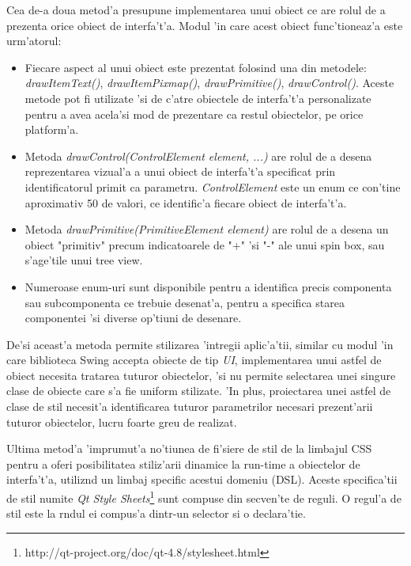 \medskip

Cea de-a doua metod'a presupune implementarea unui obiect ce are rolul de a prezenta orice obiect de interfa't'a. Modul 'in care acest obiect func'tioneaz'a este urm'atorul:

\begin{itemize}
\item Fiecare aspect al unui obiect este prezentat folosind una din metodele: \emph{drawItemText()}, \emph{drawItemPixmap()}, \emph{drawPrimitive()}, \emph{drawControl()}. Aceste metode pot fi utilizate 'si de c'atre obiectele de interfa't'a personalizate pentru a avea acela'si mod de prezentare ca restul obiectelor, pe orice platform'a. 
\item Metoda \emph{drawControl(ControlElement element, ...)} are rolul de a desena reprezentarea vizual'a a unui obiect de interfa't'a specificat prin identificatorul primit ca parametru. \emph{ControlElement} este un enum ce con'tine aproximativ 50 de valori, ce identific'a fiecare obiect de interfa't'a.
\item Metoda \emph{drawPrimitive(PrimitiveElement element)} are rolul de a desena un obiect "primitiv" precum indicatoarele de "+" 'si "-" ale unui spin box, sau s'age'tile unui tree view.
\item Numeroase enum-uri sunt disponibile pentru a identifica precis componenta sau subcomponenta ce trebuie desenat'a, pentru a specifica starea componentei 'si diverse op'tiuni de desenare.
\end{itemize}

De'si aceast'a metoda permite stilizarea 'intregii aplic'a'tii, similar cu modul 'in care biblioteca Swing accepta obiecte de tip \emph{UI}, implementarea unui astfel de obiect necesita tratarea tuturor obiectelor, 'si nu permite selectarea unei singure clase de obiecte care s'a fie uniform stilizate. 'In plus, proiectarea unei astfel de clase de stil necesit'a identificarea tuturor parametrilor necesari prezent'arii tuturor obiectelor, lucru foarte greu de realizat.

\medskip

Ultima metod'a 'imprumut'a no'tiunea de fi'siere de stil de la limbajul CSS pentru a oferi posibilitatea stiliz'arii dinamice la run-time a obiectelor de interfa't'a, utiliz{\ia}nd un limbaj specific acestui domeniu (DSL). Aceste specifica'tii de stil numite \emph{Qt Style Sheets}\footnote{http://qt-project.org/doc/qt-4.8/stylesheet.html} sunt compuse din secven'te de reguli. O regul'a de stil este la r{\ia}ndul ei compus'a dintr-un selector si o declara'tie. 


